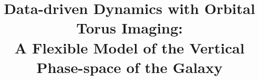



\documentclass[modern]{aastex631}

\usepackage{microtype}  %
\usepackage{amsmath}
\usepackage{amsfonts}
\usepackage{amssymb}
\usepackage{booktabs}
\usepackage{graphicx}

\usepackage{enumitem}

\renewcommand{\twocolumngrid}{\onecolumngrid}
\setlength{\parindent}{1.1\baselineskip}
\addtolength{\topmargin}{-0.2in}
\addtolength{\textheight}{0.4in}
\sloppy\sloppypar\raggedbottom\frenchspacing

\graphicspath{{figures/}}


\shorttitle{}



\title{
    Data-driven Dynamics with Orbital Torus Imaging:  \\
    A Flexible Model of the Vertical Phase-space of the Galaxy
}

\newcommand{\affcca}{
    Center for Computational Astrophysics, Flatiron Institute, \\
    162 Fifth Ave, New York, NY 10010, USA
}

